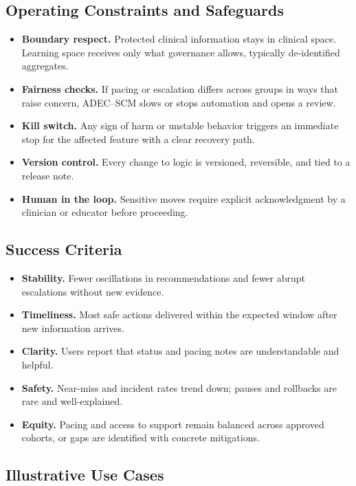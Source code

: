 \documentclass[12pt]{article}
\begin{document}
\subsection*{Operating Constraints and Safeguards}
\begin{itemize}[leftmargin=*]
  \item \textbf{Boundary respect.} Protected clinical information stays in clinical space. Learning space receives only what governance allows, typically de-identified aggregates.
  \item \textbf{Fairness checks.} If pacing or escalation differs across groups in ways that raise concern, ADEC–SCM slows or stops automation and opens a review.
  \item \textbf{Kill switch.} Any sign of harm or unstable behavior triggers an immediate stop for the affected feature with a clear recovery path.
  \item \textbf{Version control.} Every change to logic is versioned, reversible, and tied to a release note.
  \item \textbf{Human in the loop.} Sensitive moves require explicit acknowledgment by a clinician or educator before proceeding.
\end{itemize}

\subsection*{Success Criteria}
\begin{itemize}[leftmargin=*]
  \item \textbf{Stability.} Fewer oscillations in recommendations and fewer abrupt escalations without new evidence.
  \item \textbf{Timeliness.} Most safe actions delivered within the expected window after new information arrives.
  \item \textbf{Clarity.} Users report that status and pacing notes are understandable and helpful.
  \item \textbf{Safety.} Near-miss and incident rates trend down; pauses and rollbacks are rare and well-explained.
  \item \textbf{Equity.} Pacing and access to support remain balanced across approved cohorts, or gaps are identified with concrete mitigations.
\end{itemize}

\subsection*{Illustrative Use Cases}
\end{document}
